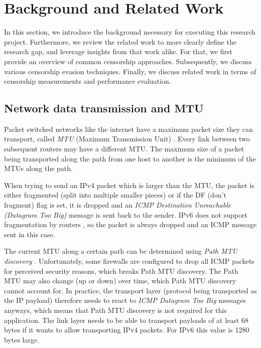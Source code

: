 
\chapter{Background and Related Work}
\label{chap:background}


In this section, we introduce the background necessary for executing this research project.
Furthermore, we review the related work to more clearly define the research gap, and leverage insights from that work alike.
For that, we first provide an overview of common censorship approaches.
Subsequently, we discuss various censorship evasion techniques.
Finally, we discuss related work in terms of censorship measurements and performance evaluation.

\section{Network data transmission and MTU}
Packet switched networks like the internet have a maximum packet size they can transport, called \textit{MTU} (Maximum Transmission Unit) \cite{wiki:Maximum_transmission_unit}.
Every link between two subsequent routers may have a different MTU.
The maximum size of a packet being transported along the path from one host to another is the minimum of the MTUs along the path.

When trying to send an IPv4 packet which is larger than the MTU, the packet is either fragmented (split into multiple smaller pieces) or if the DF (don't fragment) flag is set, it is dropped and an \textit{ICMP Destination Unreachable (Datagram Too Big)} message is sent back to the sender.
IPv6 does not support fragmentation by routers \cite{rfc2460}, so the packet is always dropped and an ICMP message sent in this case.

The current MTU along a certain path can be determined using \textit{Path MTU discovery} \cite{wiki:Path_MTU_Discovery}.
Unfortunately, some firewalls are configured to drop all ICMP packets for perceived security reasons, which breaks Path MTU discovery.
The Path MTU may also change (up or down) over time, which Path MTU discovery cannot account for.
In practice, the transport layer (protocol being transported as the IP payload) therefore needs to react to \textit{ICMP Datagram Too Big} messages anyways, which means that Path MTU discovery is not required for this application.
The link layer needs to be able to transport payloads of at least 68 bytes if it wants to allow transporting IPv4 packets.
For IPv6 this value is 1280 bytes large.

